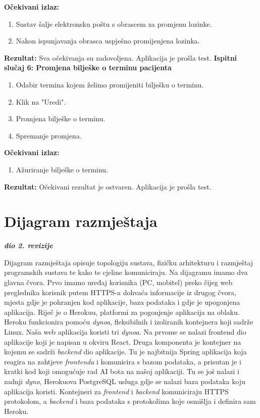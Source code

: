 			\textbf{Očekivani izlaz:}
			\begin{enumerate}
				\item Sustav šalje elektronsku poštu s obrascem za promjenu lozinke.
				\item Nakon ispunjavanja obrasca uspješno promijenjena lozinka.
			\end{enumerate}
			\textbf{Rezultat:} Sva očekivanja su zadovoljena. \color{green} Aplikacija je prošla test. \color{black} \newline
			\textbf{Ispitni slučaj 6: Promjena bilješke o terminu pacijenta}
			\begin{enumerate}
				\item Odabir termina kojem želimo promijeniti bilješku o terminu.
				\item Klik na "Uredi".
				\item Promjena bilješke o terminu.
				\item Spremanje promjena.
			\end{enumerate}
			\textbf{Očekivani izlaz:}
			\begin{enumerate}
				\item Ažuriranje bilješke o terminu.
			\end{enumerate}
			\textbf{Rezultat:} Očekivani rezultat je ostvaren. \color{green} Aplikacija je prošla test. \color{black} \newline

			
			\eject 
		
		
		\section{Dijagram razmještaja}
			
			\textbf{\textit{dio 2. revizije}}
			
			Dijagram razmještaja opisuje topologiju sustava, fizičku arhitekturu i razmještaj programskih sustava te kako te cjeline komuniciraju. Na dijagramu imamo dva glavna čvora. Prvo imamo uređaj korisnika (PC, mobitel) preko čijeg web preglednika korisnik putem HTTPS-a dohvaća informacije iz drugog čvora, mjesta gdje je pohranjen kod aplikacije, baza podataka i gdje je upogonjena aplikacija. Riječ je o Herokuu, platformi za pogonjenje aplikacija na oblaku. Heroku funkcionira pomoću \textit{dynoa}, fleksibilnih i izoliranih kontejnera koji sadrže Linux. Naša web aplikacija koristi tri \textit{dynoa}. Na prvome se nalazi frontend dio aplikacije koji je napisan u okviru React. Druga komponenta je kontejner na kojemu se sadrži \textit{backend} dio aplikacije. Tu je najbitnija Spring aplikacija koja reagira na zahtjeve \textit{frontenda} i komunicira s bazom podataka, a prisutan je i kratki kod koji omogućuje rad AI bota na našoj aplikaciji. Tu se još nalazi i zadnji \textit{dyno}, Herokuova PostgreSQL usluga gdje se nalazi baza podataka koju aplikacija koristi. Kontejneri za \textit{frontend} i \textit{backend} komuniciraju HTTPS protokolom, a \textit{backend} i baza podataka s protokolima koje osmišlja i definira sam Heroku.

